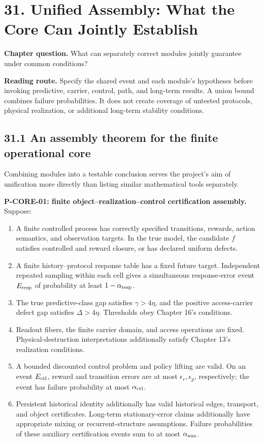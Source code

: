\documentclass[
  english,
  11pt,
  oneside]{book}
\providecommand{\tightlist}{%
  \setlength{\itemsep}{0pt}\setlength{\parskip}{0pt}}
\begin{document}
\chapter{31. Unified Assembly: What the Core Can Jointly Establish}\label{ch-31}

\textbf{Chapter question.} What can separately correct modules jointly guarantee under common conditions?

\textbf{Reading route.} Specify the shared event and each module's hypotheses before invoking predictive, carrier, control, path, and long-term results. A union bound combines failure probabilities. It does not create coverage of untested protocols, physical realization, or additional long-term stability conditions.

\section{31.1 An assembly theorem for the finite operational core}\label{an-assembly-theorem-for-the-finite-operational-core}

Combining modules into a testable conclusion serves the project's aim of unification more directly than listing similar mathematical tools separately.

\hypertarget{p-core-01}{}\label{p-core-01}

\textbf{P-CORE-01: finite object--realization--control certification assembly.} Suppose:

\begin{enumerate}
\def\labelenumi{\arabic{enumi}.}
\tightlist
\item
  A finite controlled process has correctly specified transitions, rewards, action semantics, and observation targets. In the true model, the candidate \(f\) satisfies controlled and reward closure, or has declared uniform defects.
\item
  A finite history--protocol response table has a fixed future target. Independent repeated sampling within each cell gives a simultaneous response-error event \(E_{\rm resp}\) of probability at least \(1-\alpha_{\rm resp}\).
\item
  The true predictive-class gap satisfies \(\gamma>4\eta\), and the positive access-carrier defect gap satisfies \(\Delta>4\eta\). Thresholds obey Chapter 16's conditions.
\item
  Readout fibers, the finite carrier domain, and access operations are fixed. Physical-destruction interpretations additionally satisfy Chapter 13's realization conditions.
\item
  A bounded discounted control problem and policy lifting are valid. On an event \(E_{\rm ctl}\), reward and transition errors are at most \(\epsilon_r,\epsilon_p\), respectively; the event has failure probability at most \(\alpha_{\rm ctl}\).
\item
  Persistent historical identity additionally has valid historical edges, transport, and object certificates. Long-term stationary-error claims additionally have appropriate mixing or recurrent-structure assumptions. Failure probabilities of these auxiliary certification events sum to at most \(\alpha_{\rm aux}\).
\end{enumerate}
\end{document}
